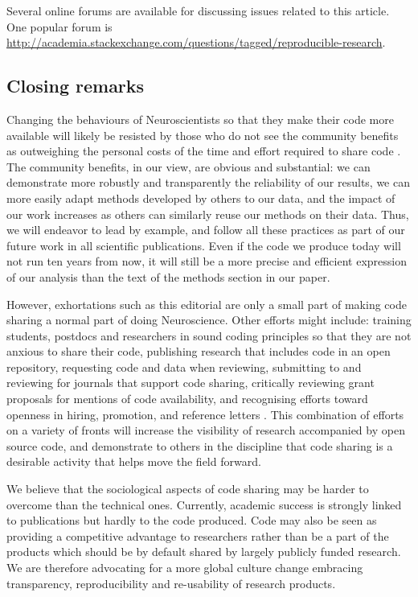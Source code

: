\documentclass[11pt]{article}
\begin{document}
Several online forums are available for discussing issues related to
this article.  One popular forum is
\url{http://academia.stackexchange.com/questions/tagged/reproducible-research}.




\subsection*{Closing remarks}

Changing the behaviours of Neuroscientists so that they make their code more available 
will likely be resisted by those who do not see the community benefits as outweighing 
the personal costs of the time and effort required to share code \cite{stodden2010scientific}. 
The community benefits, in our view, are obvious and substantial: we can demonstrate 
more robustly and transparently the reliability of our results, we can more easily adapt
 methods developed by others to our data, and the impact of our work increases as others 
 can similarly reuse our methods on their data. Thus, we will endeavor to lead 
 by example, and follow all these practices as part of our future work in all scientific publications. 
 Even if the code we produce today will not run ten years from now, it will still be a more precise 
 and efficient expression of our analysis than the text of the methods section in our paper. 

However, exhortations such as this editorial are only a small part of making 
code sharing a normal part of doing Neuroscience. Other efforts might include: training  
students,  postdocs and researchers in sound coding principles so that they are not anxious to share their code, 
publishing research that includes code in an open repository, requesting code and data when reviewing, 
submitting to and reviewing for journals that support code sharing, critically reviewing  grant proposals
 for mentions of code availability, and recognising efforts toward openness in hiring, promotion, 
 and reference letters \cite{leveque2012reproducible}. This combination of efforts on a variety of fronts 
 will increase the visibility of research accompanied by open source code, and demonstrate to 
 others in the discipline that code sharing is a desirable activity that helps move the field forward. 

We believe that the sociological aspects of code sharing may be harder to overcome than the technical ones.
Currently, academic success is strongly linked to publications but hardly to the code produced. Code may also be seen as providing a competitive advantage to researchers rather than be a part of the products which should be by default shared by largely publicly funded research. We are therefore advocating for a more global culture change embracing transparency, reproducibility and re-usability of research products.   
\end{document}
